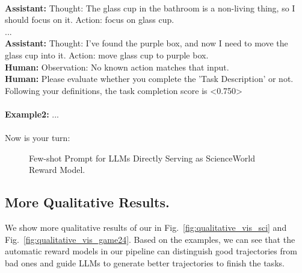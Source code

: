 \begin{tcolorbox}[breakable,title=Few-shot Prompt for LLMs Directly Serving as ScienceWorld Reward Model]
{}\\
\textcolor{my_purple}{
\textbf{Assistant: }
Thought: The glass cup in the bathroom is a non-living thing, so I should focus on it. Action: focus on glass cup.
}\\
... \\
\textcolor{my_purple}{
\textbf{Assistant: }
Thought: I've found the purple box, and now I need to move the glass cup into it. Action: move glass cup to purple box.
}\\
\textcolor{my_blue!50}{
\textbf{Human:} Observation: No known action matches that input.
}\\
\textcolor{my_blue!50}{
\textbf{Human:} Please evaluate whether you complete the 'Task Description' or not.
}\\
Following your definitions, the task completion score is <0.750>\\
\\
\textcolor{my_green!50}{\textbf{Example2:} ...}\\
\\
\textcolor{my_blue!50}{Now is your turn:\\
}
\end{tcolorbox}
\begin{figure}[!htp]
    \centering
    \vspace{-8pt}
    \caption{
    Few-shot Prompt for LLMs Directly Serving as ScienceWorld Reward Model.
    }
    \label{fig:fewshot_sciworld}
\end{figure}

\subsection{More Qualitative Results.}
We show more qualitative results of our \Model in Fig.~\ref{fig:qualitative_vis_sci} and Fig.~\ref{fig:qualitative_vis_game24}. Based on the examples, we can see that the automatic reward models in our pipeline can distinguish good trajectories from bad ones and guide LLMs to generate better trajectories to finish the tasks.

